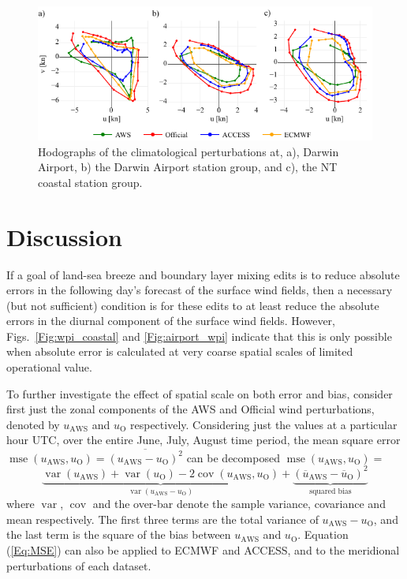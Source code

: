 \documentclass[twocol]{ametsoc}
\DeclareMathOperator{\mse}{mse}
\DeclareMathOperator{\cov}{cov}
\DeclareMathOperator{\var}{var}
\begin{document}
\begin{figure}
\centering
\includegraphics[width=39pc]{nt_ellipse_hodo.pdf}
\caption{Hodographs of the climatological perturbations at, a), Darwin Airport, b) the Darwin Airport station group, and c), the NT coastal station group.}
\label{Fig:nt_ellipse_hodo}
\end{figure}

\section{Discussion}
\label{Sec:Discussion}
If a goal of land-sea breeze and boundary layer mixing edits is to reduce absolute errors in the following day’s forecast of the surface wind fields, then a necessary (but not sufficient) condition is for these edits to at least reduce the absolute errors in the diurnal component of the surface wind fields. However, Figs.~\ref{Fig:wpi_coastal} and \ref{Fig:airport_wpi} indicate that this is only possible when absolute error is calculated at very coarse spatial scales of limited operational value.  

To further investigate the effect of spatial scale on both error and bias, consider first just the zonal components of the AWS and Official wind perturbations, denoted by $u_\text{AWS}$ and $u_\text{O}$ respectively. Considering just the values at a particular hour UTC, over the entire June, July, August time period, the mean square error $\mse\left(u_\text{AWS}, u_\text{O}\right) = \overline{\left(u_\text{AWS} - u_\text{O}\right)^2}$ can be decomposed $\mse\left(u_\text{AWS}, u_\text{O}\right)=$ 
\begin{equation}
\underbrace{\var\left(u_\text{AWS}\right) + \var\left(u_\text{O}\right) - 2\cov\left(u_\text{AWS}, u_\text{O}\right)}_{\var\left(u_\text{AWS} - u_\text{O}\right)} + \underbrace{\left(\overline{u}_\text{AWS} - \overline{u}_\text{O}\right)^2}_{\text{squared bias}} \label{Eq:MSE}
\end{equation}
where $\var$, $\cov$ and the over-bar denote the sample variance, covariance and mean respectively. The first three terms are the total variance of $u_\text{AWS} - u_\text{O}$, and the last term is the square of the bias between $u_\text{AWS}$ and $u_\text{O}$. Equation (\ref{Eq:MSE}) can also be applied to ECMWF and ACCESS, and to the meridional perturbations of each dataset. 
\end{document}
